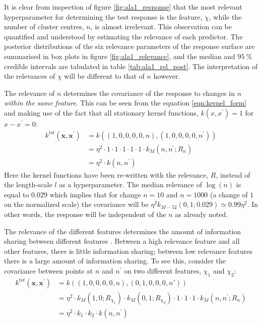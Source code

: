 It is clear from inspection of figure \ref{fig:ala1_response} that the most relevant hyperparameter for determining the test response is the feature, $\chi$, while the number of cluster centres,  $n$, is almost irrelevant. This observation can be quantified and understood by estimating the relevance of each predictor. The posterior distributions of the six relevance parameters of the response surface are summarised in box plots in figure \ref{fig:ala1_relevance}, and  the median and $\SI{95}{\percent}$ credible intervals  are tabulated in table \ref{tab:ala1_rel_post}. The interpretation of the relevances of $\chi$ will be different to that of $n$ however. 

The relevance of $n$ determines the covariance of the response to changes in $n$ \emph{within the same feature}. This can be seen from the equation \ref{eqn:kernel_form} and making use of the fact that all stationary kernel functions, $k(x, x^{\prime})=1$ for $x-x^{\prime}=0$:
\begin{equation*}
\begin{split}
    k^{tot}(\mathbf{x}, \mathbf{x}^{\prime})& = k\left((1, 0, 0, 0, 0, n), (1, 0, 0, 0, 0, n^{\prime})\right) \\
    & = \eta^{2}\cdot 1 \cdot 1\cdot 1 \cdot 1\cdot 1 \cdot k_{M}(n, n^{\prime}; R_{n}) \\
    & = \eta^{2}\cdot k(n, n^{\prime})
\end{split}
\end{equation*}
Here the kernel functions have been re-written with the relevance, $R$, instead of the length-scale $l$ as a hyperparameter. The median relevance of $\log{(n)}$ is equal to $\num{0.029}$ which implies that for change $n=10$ and $n=1000$ (a change of $1$ on the normalized scale) the covariance will be $\eta^{2}k_{M-52}(0,1; 0.029) \simeq 0.99\eta^{2}$. In other words, the response will be independent of the $n$ as already noted. 

The relevance of the different features determines the amount of information sharing between different features \cite{duvenaud2011additive}. Between a high relevance feature and all other features, there is little information sharing; between low relevance features there is a large amount of information sharing. To see this, consider the covariance between points at $n$ and $n^{\prime}$ on two different features, $\chi_1$ and $\chi_2$: 
\begin{equation*}
\begin{split}
    k^{tot}(\mathbf{x}, \mathbf{x}^{\prime})& = k\left((1, 0, 0, 0, 0, n), (0, 1, 0, 0, 0, n')\right) \\
    & = \eta^{2}\cdot k_{M}\left(1, 0; R_{\chi_1}\right) \cdot k_{M}\left(0, 1; R_{\chi_2}\right) \cdot 1 \cdot 1\cdot 1 \cdot k_{M}(n, n^{\prime}; R_{n}) \\
    &=  \eta^{2}\cdot k_{1}\cdot k_{2}\cdot k(n, n^{\prime})
\end{split}
\end{equation*}

